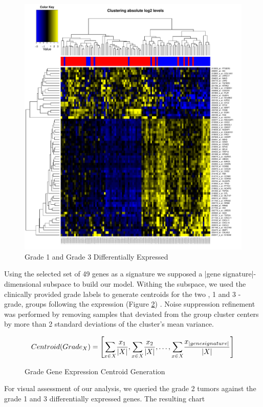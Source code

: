 \documentclass[a4paper,10pt]{article}
\begin{document}
\begin{figure}
\centering
\includegraphics[scale=0.50]{docs/grade1and3differentiallyexpressed}
\caption{Grade 1 and Grade 3 Differentially Expressed}\label{grade13diff}
\end{figure}
Using the selected set of 49 genes as a signature we supposed a |gene signature|-dimensional subspace to build our model.
Withing the subspace, we used the clinically provided grade labels to generate centroids for the two , 1 and 3 - grade, groups following
the expression (Figure \ref{centroid}) . Noise suppression refinement was performed by removing samples that deviated from the group cluster
centers by more than 2 standard deviations of the cluster's mean variance.\\
\begin{figure}
$$
Centroid(Grade_X)= \left[              \underset{x\in X}     \sum{  { {x_1}    \over {| X |} } }   ,   
 \underset{x\in X}     \sum{  { {x_2}    \over {| X |} } },
\ldots ,
 \underset{x\in X}     \sum{  { {x_{| gene signature |}}    \over {| X |} } }                 \right] 
$$
\caption{Grade Gene Expression Centroid Generation}\label{centroid}
\end{figure}
For visual assessment of our analysis, we queried the grade 2 tumors against the grade 1 and 3 differentially expressed genes. The resulting chart
\end{document}
